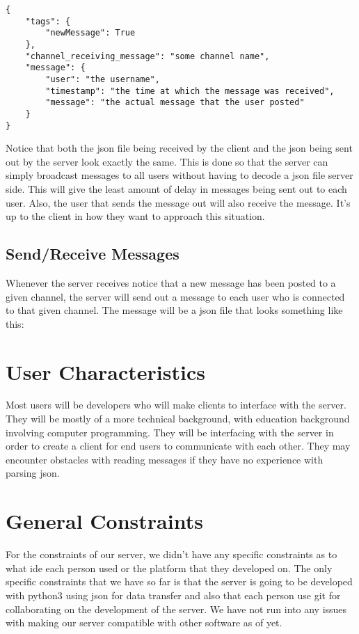 \begin{lstlisting}[style=json]
{
    "tags": {
        "newMessage": True
    },
    "channel_receiving_message": "some channel name",
    "message": {
        "user": "the username",
        "timestamp": "the time at which the message was received",
        "message": "the actual message that the user posted"
    }
}
\end{lstlisting}

Notice that both the \gls{json} file being received by the client and the \gls{json} being sent out by the server look exactly the same. This is done so that the server can simply broadcast messages to all users without having to decode a \gls{json} file server side. This will give the least amount of delay in messages being sent out to each user. Also, the user that sends the message out will also receive the message. It's up to the client in how they want to approach this situation.

\subsection{Send/Receive Messages}
Whenever the server receives notice that a new message has been posted to a given channel, the server will send out a message to each user who is connected to that given channel. The message will be a \gls{json} file that looks something like this:


\section{User Characteristics}\label{user-characteristics}
Most users will be developers who will make clients to interface with the server. They will be mostly of a more technical background, with education background involving computer programming. They will be interfacing with the server in order to create a client for end users to communicate with each other. They may encounter obstacles with reading messages if they have no experience with parsing \gls{json}.

\section{General Constraints}\label{general-constraints}
For the constraints of our server, we didn't have any specific constraints as to what \acrfull{ide} each person used or the platform that they developed on. The only specific constraints that we have so far is that the server is going to be developed with \gls{python}3 using \gls{json} for data transfer and also that each person use \gls{git} for collaborating on the development of the server. We have not run into any issues with making our server compatible with other software as of yet.

